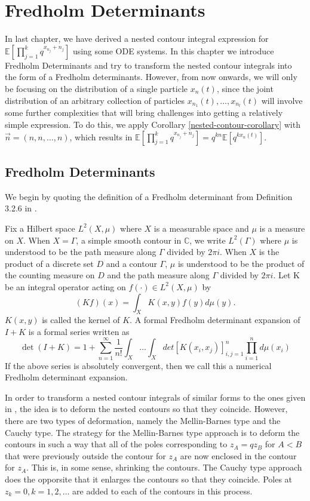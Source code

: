 \chapter{Fredholm Determinants}
In last chapter, we have derived a nested contour integral expression for $\mathbb{E}[\prod_{j=1}^k q^{x_{n_j}+n_j}]$ using some ODE systems. In this chapter we introduce Fredholm Determinants and try to transform the nested contour integrals into the form of a Fredholm determinants. However, from now onwards, we will only be focusing on the distribution of a single particle $x_n(t)$, since the joint distribution of an arbitrary collection of particles $x_{n_1}(t), \dots, x_{n_l}(t)$ will involve some further complexities that will bring challenges into getting a relatively simple expression. To do this, we apply Corollary \ref{nested-contour-corollary} with $\vec{n} = (n,n,\dots, n)$, which results in $\mathbb{E}[\prod_{j=1}^k q^{x_{n_j}+n_j}] = q^{kn} \mathbb{E} [q^{kx_n(t)}]$. 

\section{Fredholm Determinants}
We begin by quoting the definition of a Fredholm determinant from Definition 3.2.6 in \cite{macdonald2014}.

\begin{definition}
Fix a Hilbert space $L^2(X,\mu)$ where $X$ is a measurable space and $\mu$ is a measure on $X$. When $X = \Gamma$, a simple smooth contour in $\mathbb{C}$, we write $L^2(\Gamma)$ where $\mu$ is understood to be the path measure along $\Gamma$ divided by $2 \pi i$. When $X$ is the product of a discrete set $D$ and a contour $\Gamma$, $\mu$ is understood to be the product of the counting measure on $D$ and the path measure along $\Gamma$ divided by $2 \pi i$.
Let K be an integral operator acting on $f(\cdot) \in L^2(X,\mu)$ by $$(Kf)(x) = \int_X K(x,y) f(y) d\mu(y).$$ $K(x,y)$ is called the kernel of $K$. A formal Fredholm determinant expansion of $I+K$ is a formal series written as $$\det(I+K) = 1 + \sum_{n=1}^{\infty} \frac{1}{n!} \int_X \dots \int_X det[K(x_i,x_j)]_{i,j=1}^{n} \prod_{i=1}^{n} d\mu(x_i)$$
If the above series is absolutely convergent, then we call this a numerical Fredholm determinant expansion.
\end{definition}

In order to transform a nested contour integrals of similar forms to the ones given in , the idea is to deform the nested contours so that they coincide. However, there are two types of deformation, namely the Mellin-Barnes type and the Cauchy type. The strategy for the Mellin-Barnes type approach is to deform the contours in such a way that all of the poles corresponding to $z_A = qz_B$ for $A < B$ that were previously outside the contour for $z_A$ are now enclosed in the contour for $z_A$. This is, in some sense, shrinking the contours. The Cauchy type approach does the opporsite that it enlarges the contours so that they coincide. Poles at $z_k = 0, k = 1,2,\dots$ are added to each of the contours in this process.

